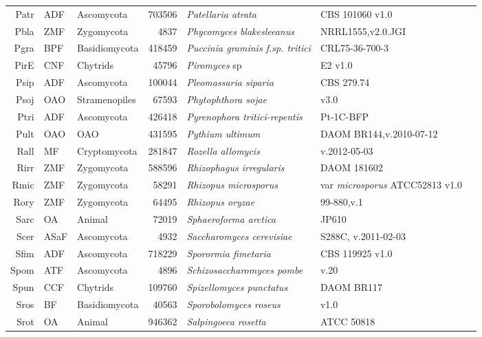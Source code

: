 {{{\begin{longtable}{rllrlll}
  Patr & ADF & Ascomycota & 703506 & \emph{Patellaria atrata} & CBS 101060 v1.0 & \cite{Patr} \\ 
  Pbla & ZMF & Zygomycota & 4837 & \emph{Phycomyces blakesleeanus} & NRRL1555,v2.0.JGI & \cite{Pbla} \\ 
  Pgra & BPF & Basidiomycota & 418459 & \emph{Puccinia graminis f.sp. tritici} & CRL75-36-700-3 & \cite{Pgra} \\ 
  PirE & CNF & Chytrids & 45796 & \emph{Piromyces} sp & E2 v1.0 & \cite{PirE} \\ 
  Psip & ADF & Ascomycota & 100044 & \emph{Pleomassaria siparia} & CBS 279.74 & \cite{Psip} \\ 
  Psoj & OAO & Stramenopiles & 67593 & \emph{Phytophthora sojae} & v3.0 & \cite{Tyler2006} \\ 
  Ptri & ADF & Ascomycota & 426418 & \emph{Pyrenophora tritici-repentis} & Pt-1C-BFP & \cite{Manning2013} \\ 
  Pult & OAO & OAO & 431595 & \emph{Pythium ultimum} & DAOM BR144,v.2010-07-12 & \cite{Levesque2010} \\ 
  Rall & MF & Cryptomycota & 281847 & \emph{Rozella allomycis} & v.2012-05-03 & \cite{James2013} \\ 
  Rirr & ZMF & Zygomycota & 588596 & \emph{Rhizophagus irregularis} & DAOM 181602 & \cite{Tisserant2013} \\ 
  Rmic & ZMF & Zygomycota & 58291 & \emph{Rhizopus microsporus} & var \emph{microsporus} ATCC52813 v1.0 & \cite{Rmic} \\ 
  Rory & ZMF & Zygomycota & 64495 & \emph{Rhizopus oryzae} & 99-880,v.1 & \cite{Ma2009} \\ 
  Sarc & OA & Animal & 72019 & \emph{Sphaeroforma arctica } & JP610 & \cite{RuizTrillo2007} \\ 
  Scer & ASaF & Ascomycota & 4932 & \emph{Saccharomyces cerevisiae} & S288C, v.2011-02-03 & \cite{Scer} \\ 
  Sfim & ADF & Ascomycota & 718229 & \emph{Sporormia fimetaria} & CBS 119925 v1.0 & \cite{Sfim} \\ 
  Spom & ATF & Ascomycota & 4896 & \emph{Schizosaccharomyces pombe} & v.20 & \cite{Wood2002} \\ 
  Spun & CCF & Chytrids & 109760 & \emph{Spizellomyces punctatus} & DAOM BR117 & \cite{RuizTrillo2007} \\ 
  Sros & BF & Basidiomycota & 40563 & \emph{Sporobolomyces roseus} & v1.0 & \cite{Sros} \\ 
  Srot & OA & Animal & 946362 & \emph{Salpingoeca rosetta} & ATCC 50818 & \cite{RuizTrillo2007} \\ 

\end{longtable}}}}
